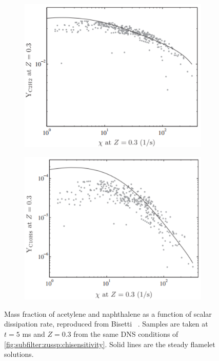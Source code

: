 \begin{figure}[ht]
  \centering
  \begin{subfigure}[b]{0.375\linewidth}
    \centering
    \includegraphics[width=\linewidth]{ch-transport/figures/dns-YC2H2vschi}
  \end{subfigure}%
  \begin{subfigure}[b]{0.375\linewidth}
    \centering
    \includegraphics[width=\linewidth]{ch-transport/figures/dns-YC10H8vschi}
  \end{subfigure}
  \caption[Effects of Scalar Dissipation Rate on \texorpdfstring{$Y_{\ce{C2H2}}$}{YC2H2} and \texorpdfstring{$Y_{\ce{C10H8}}$}{YC10H8}]{Mass fraction of acetylene and naphthalene as a function of scalar dissipation rate, reproduced from Bisetti \etal~\cite{bisetti2012}. Samples are taken at $t = 5$ ms and $Z = 0.3$ from the same DNS conditions of \cref{fig:subfilter:zussp:chisensitivity}. Solid lines are the steady flamelet solutions.}
  \label{fig:transport:overview:pah:unsteadypah}
\end{figure} 

